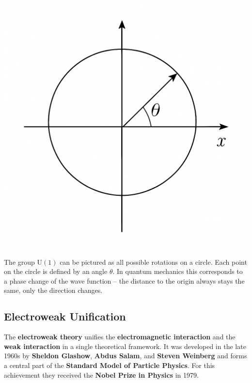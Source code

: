 \vspace{1em}
\begin{tcolorbox}[didaktikbox, title=U(1) explained intuitively]
	\label{box:u1_kreis}
	\small
	\begin{minipage}{0.35\textwidth}
		\centering
		\includegraphics[width=\linewidth]{bilder/u1_kreis.png}
	\end{minipage}%
	\begin{minipage}{0.63\textwidth}
		The group \(\mathrm{U(1)}\) can be pictured as all possible 
		rotations on a circle.  
		Each point on the circle is defined by an angle \(\theta\).  
		In quantum mechanics this corresponds to a phase change of the wave function
		– the distance to the origin always stays the same, only the direction changes.
	\end{minipage}
\end{tcolorbox}

\subsection{Electroweak Unification}

The \textbf{electroweak theory} unifies the \textbf{electromagnetic interaction} and the \textbf{weak interaction} in a single theoretical framework.  
It was developed in the late 1960s by \textbf{Sheldon Glashow}, \textbf{Abdus Salam}, and \textbf{Steven Weinberg} and forms a central part of the \textbf{Standard Model of Particle Physics}.  
For this achievement they received the \textbf{Nobel Prize in Physics} in 1979.

